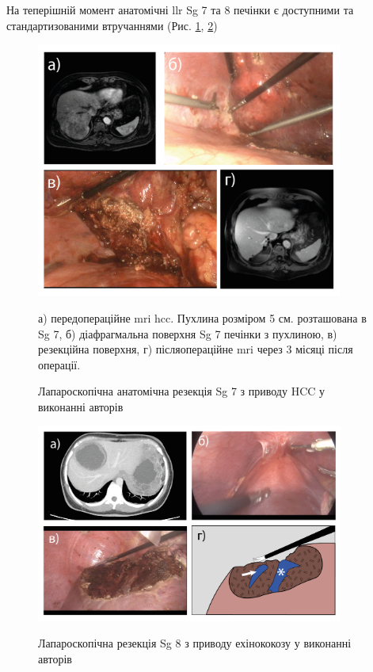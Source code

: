 \begin{refsection}
На теперішній момент анатомічні \acrshort{llr} Sg 7 та 8 печінки є доступними та стандартизованими втручаннями (Рис. \ref{fig:Complex_localisation_Sg7}, \ref{fig:Complex_localisation_Sg8}) 


\begin{figure}[htbp]
\caption{Лапароскопічна анатомічна резекція Sg 7 з приводу HCC у виконанні авторів}

\includegraphics[width=0.9\textwidth]{Illustrations/Chapter_01/Complex_localisation_Sg7.png}
\label{fig:Complex_localisation_Sg7}

\medskip
\small
а) передопераційне \acrshort{mri} \acrshort{hcc}. Пухлина розміром 5 см. розташована в Sg 7,  б) діафрагмальна поверхня Sg 7 печінки з пухлиною, в) резекційна поверхня, г) післяопераційне \acrshort{mri} через 3 місяці після операції.

\end{figure}


\begin{figure}[htbp]
\caption{Лапароскопічна резекція Sg 8 з приводу ехінококозу у виконанні авторів}

\includegraphics[width=0.9\textwidth]{Illustrations/Chapter_01/Complex_localisation_Sg8.png}
\label{fig:Complex_localisation_Sg8}


\end{figure}
\end{refsection}
